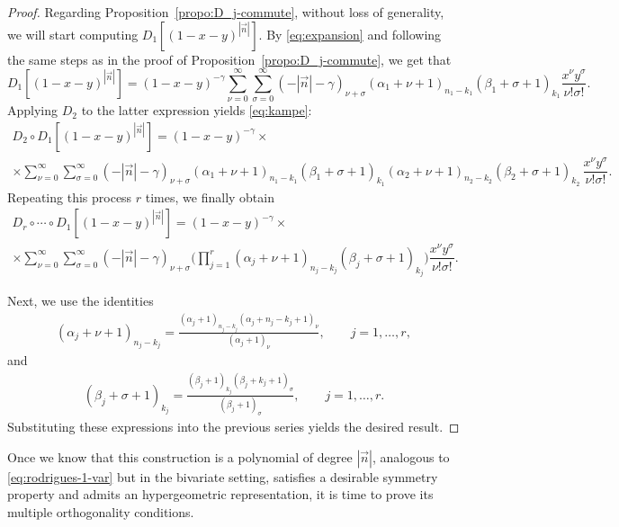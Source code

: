 \documentclass[11pt,reqno]{amsart}
\theoremstyle{definition}
\begin{document}
\begin{proof}

Regarding Proposition~\ref{propo:D_j-commute}, without loss of generality, we will start computing $D_1[(1-x-y)^{|\vec n|}]$. By \eqref{eq:expansion} and following the same steps as in the proof of Proposition~\ref{propo:D_j-commute}, we get that
\begin{equation}
    D_1[(1-x-y)^{|\vec n|}]=(1-x-y)^{-\gamma}\sum_{\nu=0}^\infty\sum_{\sigma=0}^{\infty}(-|\vec n|-\gamma)_{\nu+\sigma}(\alpha_1+\nu+1)_{n_1-k_1}(\beta_1+\sigma+1)_{k_1}\dfrac{x^\nu y^\sigma}{\nu!\sigma!}.
\end{equation}
Applying $D_2$ to the latter expression yields \eqref{eq:kampe}:
\begin{multline*}
D_2\circ D_1[(1-x-y)^{|\vec n|}] = (1-x-y)^{-\gamma}\times  \\ \times \sum_{\nu=0}^\infty\sum_{\sigma=0}^{\infty}(-|\vec n|-\gamma)_{\nu+\sigma}(\alpha_1+\nu+1)_{n_1-k_1}(\beta_1+\sigma+1)_{k_1}(\alpha_2+\nu+1)_{n_2-k_2}(\beta_2+\sigma+1)_{k_2}\,\dfrac{x^\nu y^\sigma}{\nu!\sigma!}.
\end{multline*}
Repeating this process $r$ times, we finally obtain
\begin{multline}\label{eq:series-expansion}
D_r\circ\cdots\circ  D_1[(1-x-y)^{|\vec n|}]=(1-x-y)^{-\gamma}\times  \\ \times \sum_{\nu=0}^\infty\sum_{\sigma=0}^{\infty}(-|\vec n|-\gamma)_{\nu+\sigma} \Big(\prod_{j=1}^r (\alpha_j+\nu+1)_{n_j-k_j}(\beta_j+\sigma+1)_{k_j}\Big)\dfrac{x^\nu y^\sigma}{\nu!\sigma!}.
\end{multline}

Next, we use the identities
\begin{align*}
(\alpha_j+\nu+1)_{n_j-k_j}
=
\frac{(\alpha_j+1)_{n_j-k_j}
(\alpha_j+n_j-k_j+1)_\nu}
{(\alpha_j+1)_\nu},
\qquad j=1,\dots,r,
\end{align*}
and
\begin{align*}
(\beta_j+\sigma+1)_{k_j}
=
\frac{(\beta_j+1)_{k_j}
(\beta_j+k_j+1)_\sigma}
{(\beta_j+1)_\sigma},
\qquad j=1,\dots, r.
\end{align*}
Substituting these expressions into the previous series yields the desired result.
    
\end{proof}

Once we know that this construction is a polynomial of degree $|\vec n|$, analogous to \eqref{eq:rodrigues-1-var} but in the bivariate setting, satisfies a desirable symmetry property and admits an hypergeometric representation, it is time to prove its multiple orthogonality conditions.
\end{document}
